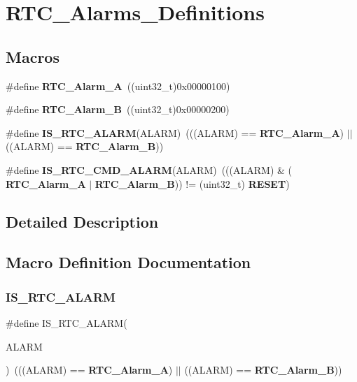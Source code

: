 \section{R\+T\+C\+\_\+\+Alarms\+\_\+\+Definitions}
\label{group__RTC__Alarms__Definitions}
\subsection*{Macros}
\begin{DoxyCompactItemize}
\item 
\#define \textbf{ R\+T\+C\+\_\+\+Alarm\+\_\+A}~((uint32\+\_\+t)0x00000100)
\item 
\#define \textbf{ R\+T\+C\+\_\+\+Alarm\+\_\+B}~((uint32\+\_\+t)0x00000200)
\item 
\#define \textbf{ I\+S\+\_\+\+R\+T\+C\+\_\+\+A\+L\+A\+RM}(A\+L\+A\+RM)~(((A\+L\+A\+RM) == \textbf{ R\+T\+C\+\_\+\+Alarm\+\_\+A}) $\vert$$\vert$ ((A\+L\+A\+RM) == \textbf{ R\+T\+C\+\_\+\+Alarm\+\_\+B}))
\item 
\#define \textbf{ I\+S\+\_\+\+R\+T\+C\+\_\+\+C\+M\+D\+\_\+\+A\+L\+A\+RM}(A\+L\+A\+RM)~(((A\+L\+A\+RM) \& (\textbf{ R\+T\+C\+\_\+\+Alarm\+\_\+A} $\vert$ \textbf{ R\+T\+C\+\_\+\+Alarm\+\_\+B})) != (uint32\+\_\+t)\textbf{ R\+E\+S\+ET})
\end{DoxyCompactItemize}


\subsection{Detailed Description}


\subsection{Macro Definition Documentation}
\mbox{\label{group__RTC__Alarms__Definitions_gab101ad18b0bcde557eb8caac469d7725}} 
\subsubsection{I\+S\+\_\+\+R\+T\+C\+\_\+\+A\+L\+A\+RM}
{\footnotesize\ttfamily \#define I\+S\+\_\+\+R\+T\+C\+\_\+\+A\+L\+A\+RM(\begin{DoxyParamCaption}\item[{}]{A\+L\+A\+RM }\end{DoxyParamCaption})~(((A\+L\+A\+RM) == \textbf{ R\+T\+C\+\_\+\+Alarm\+\_\+A}) $\vert$$\vert$ ((A\+L\+A\+RM) == \textbf{ R\+T\+C\+\_\+\+Alarm\+\_\+B}))}



